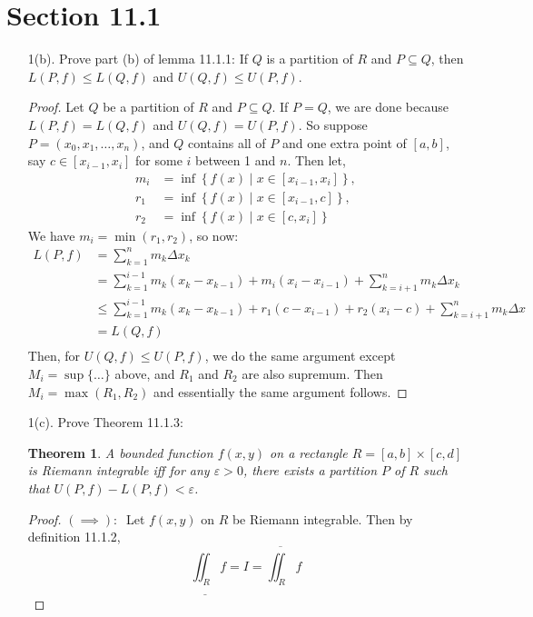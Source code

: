 \documentclass[hidelinks,12pt]{article}
\renewcommand{\leq}{\leqslant}
\newtheorem{theorem}{Theorem}
\begin{document}
\section{Section 11.1}
\begin{enumerate}
    \item[1(b).]Prove part (b) of lemma 11.1.1: If $Q$ is a partition of $R$ and $P\subseteq Q$, then $L(P,f)\leq L(Q,f)$ and $U(Q,f)\leq U(P,f)$.
        \begin{proof}
            Let $Q$ be a partition of $R$ and $P\subseteq Q$. If $P=Q$, we are done because $L(P,f)=L(Q,f)$ and $U(Q,f)=U(P,f)$. So suppose $P=(x_0,x_1,\dots,x_n)$, and $Q$ contains all of $P$ and one extra point of $[a,b]$, say $c\in[x_{i-1},x_i]$ for some $i$ between 1 and $n$. Then let,
\begin{align*}
    m_i&=\inf\left\{f(x)\mid x\in[x_{i-1},x_i]\right\},\\
    r_1&=\inf\left\{f(x)\mid x\in[x_{i-1},c]\right\},\\
    r_2&=\inf\left\{f(x)\mid x\in[c,x_i]\right\}
\end{align*}
We have $m_i=\min(r_1,r_2)$, so now:
            \begin{align*}
                L(P,f)&=\sum_{k=1}^nm_k\Delta x_k\\
                      &=\sum_{k=1}^{i-1}m_k(x_k-x_{k-1})+m_i(x_i-x_{i-1})+\sum_{k=i+1}^nm_k\Delta x_k\\
                      &\leq\sum_{k=1}^{i-1}m_k(x_k-x_{k-1})+r_1(c-x_{i-1})+r_2(x_i-c)+\sum_{k=i+1}^nm_k\Delta x\\
                      &=L(Q,f)\\
            \end{align*}
            Then, for $U(Q,f)\leq U(P,f)$, we do the same argument except $M_i=\sup\{\dots\}$ above, and $R_1$ and $R_2$ are also supremum. Then $M_i=\max(R_1,R_2)$ and essentially the same argument follows.
        \end{proof}
    \item[1(c).]Prove Theorem 11.1.3: \begin{theorem}A bounded function $f(x,y)$ on a rectangle $R=[a,b]\times[c,d]$ is Riemann integrable iff for any $\varepsilon>0$, there exists a partition $P$ of $R$ such that $U(P,f)-L(P,f)<\varepsilon$.
        \end{theorem}
        \begin{proof}
            $(\implies):\ $ Let $f(x,y)$ on $R$ be Riemann integrable. Then by definition 11.1.2, \[\underline{\iint_R}f=I=\overline{\iint_R}f\]

\end{proof}
\end{enumerate}
\end{document}
